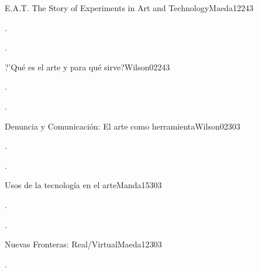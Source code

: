 \begin{syllabus}
\begin{unit}{E.A.T. The Story of Experiments in Art and Technology}{}{Maeda12}{24}{3}
   \begin{topics}
      \item . 
   \end{topics}

   \begin{learningoutcomes}
      \item .
      \end{learningoutcomes}
\end{unit}

\begin{unit}{?'Qué es el arte y para qué sirve?}{}{Wilson02}{24}{3}
   \begin{topics}
      \item . 
      \end{topics}

   \begin{learningoutcomes}
      \item .
     
   \end{learningoutcomes}
\end{unit}

\begin{unit}{Denuncia y Comunicación: El arte como herramienta}{}{Wilson02}{30}{3}
   \begin{topics}
      \item .
   \end{topics}

   \begin{learningoutcomes}
      \item .
   \end{learningoutcomes}
\end{unit}

\begin{unit}{Usos de la tecnología en el arte}{}{Manda15}{30}{3}
   \begin{topics}
      \item .
   \end{topics}

   \begin{learningoutcomes}
      \item .
   \end{learningoutcomes}
\end{unit}
\begin{unit}{Nuevas Fronteras: Real/Virtual}{}{Maeda12}{30}{3}
   \begin{topics}
      \item .
   \end{topics}


\end{unit}
\end{syllabus}

